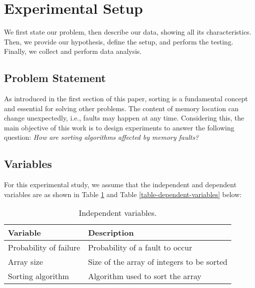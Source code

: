 \section{Experimental Setup}

We first state our problem, then describe our data, showing all its characteristics. Then, we provide our hypothesis, define the setup, and perform the testing. Finally, we collect and perform data analysis.

\subsection{Problem Statement}

As introduced in the first section of this paper, sorting is a fundamental concept and essential for solving other problems. The content of memory location can change unexpectedly, i.e., faults may happen at any time. Considering this, the main objective of this work is to design experiments to answer the following question: \textit{How are sorting algorithms affected by memory faults?}

\subsection{Variables}

For this experimental study, we assume that the independent and dependent variables are as shown in Table \ref{table-independent-variables} and Table \ref{table-dependent-variables} below:

\begin{table}[H]
    \caption{Independent variables.}
    \begin{center}
    \begin{tabular}{|l|l|}
    \hline
    \textbf{Variable} & \textbf{Description} \\
    \hline
    Probability of failure & Probability of a fault to occur \\
    \hline
    Array size & Size of the array of integers to be sorted \\
    \hline
    Sorting algorithm & Algorithm used to sort the array \\
    \hline
    \end{tabular}
    \label{table-independent-variables}
    \end{center}
\end{table}

